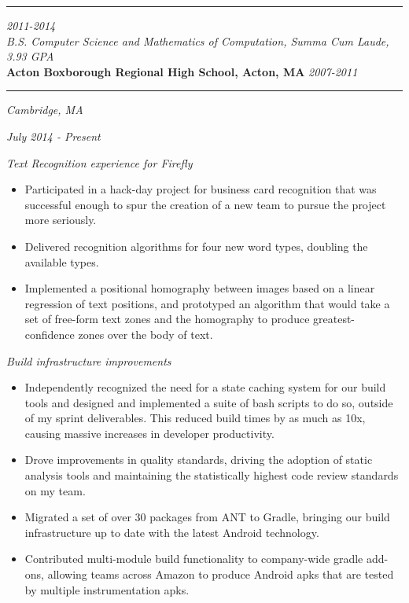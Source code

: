 \documentclass[10pt]{article}
\newcommand{\headskip}{\vspace{.075in}}
\newcommand{\miniskip}{\vspace{.03in}}
\newenvironment{compactitemize} {
  \begin{itemize}[rightmargin=.25in, topsep=0pt]
    \setlength{\itemsep}{0pt}
    \setlength{\parsep}{0pt}
    \setlength{\parskip}{0pt}
} {
  \end{itemize}
}
\begin{document}
\pagestyle{fancy}
\fancyfoot{}
\fancyhead{}

 \vspace{.05in} \hrule
\headskip

 \hfill
\emph{2011-2014}\\
\miniskip
\noindent \emph{B.S. Computer Science and Mathematics of Computation, Summa
Cum Laude, 3.93 GPA} \\
\miniskip
{\bf Acton Boxborough Regional High School, Acton, MA} \hfill
\emph{2007-2011}

\miniskip
{} \vspace{.05in} \hrule
\headskip

 \hfill \emph{Cambridge, MA}

\hfill \emph{July 2014 - Present}

\noindent \emph{Text Recognition experience for Firefly}
\begin{compactitemize}
\item Participated in a hack-day project for business card recognition
  that was successful enough to spur the creation of a new team to pursue
  the project more seriously.
\item Delivered recognition algorithms for four new word types,
  doubling the available types.
\item Implemented a positional homography between images based on a
  linear regression of text positions, and prototyped an algorithm
  that would take a set of free-form text zones and the homography to
  produce greatest-confidence zones over the body of text.
\end{compactitemize}

\noindent \emph{Build infrastructure improvements}
\begin{compactitemize}
\item Independently recognized the need for a state caching
  system for our build tools and designed and implemented a suite of
  bash scripts to do so, outside of my sprint deliverables. This
  reduced build times by as much as 10x, causing massive increases in
  developer productivity.
\item Drove improvements in quality standards, driving the adoption of
  static analysis tools and maintaining the statistically highest code
  review standards on my team.
\item Migrated a set of over 30 packages from ANT to Gradle, bringing
  our build infrastructure up to date with the latest Android technology.
\item Contributed multi-module build functionality to company-wide
  gradle add-ons, allowing teams across Amazon to produce Android apks
  that are tested by multiple instrumentation apks.
\end{compactitemize}
\end{document}
